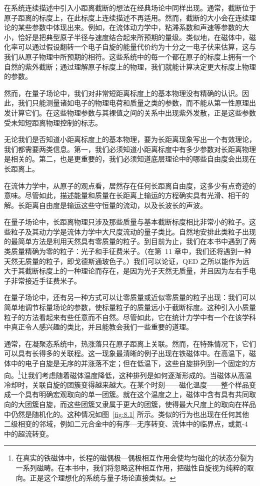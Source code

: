 在系统连续描述中引入小距离截断的想法在经典场论中同样出现。通常，截断位于原子距离的标度上，在此标度上连续描述不再适用。然而，截断的大小会在连续理论的某些参数中体现出来。例如，在流体动力学中，粘滞系数和声速等参数的大小，恰好是把典型原子半径与速度结合起来所预期的量级。类似地，在磁体中，磁化率可以通过假设翻转一个电子自旋的能量代价约为十分之一电子伏来估算，这与我们从原子物理中所预期的相符。这些系统中的每一个都在原子的标度上拥有一个自然的紫外截断；通过理解原子标度上的物理，我们就能计算决定更大标度上物理的参数。

然而，在量子场论中，我们对非常短距离标度上的基本物理没有精确的认识。因此，我们只能测量诸如电子的物理电荷和质量之类的参数，而不能从第一性原理出发计算它们。在这些物理参数与其裸值之间的关系中出现紫外发散，正是这些参数受未知短距离物理控制的标志。

无论我们是否知道小距离标度上的基本物理，要为长距离现象写出一个有效理论，我们都需要两类信息。第一，我们必须知道小距离标度中有多少参数对长距离物理是相关的。第二，也是更重要的，我们必须知道底层理论中的哪些自由度会出现在长距离上。

在流体力学中，从原子的观点看，居然存在任何长距离自由度，这多少有点奇迹的意味。尽管如此，描述能量和质量在长距离上输运的方程确实具有光滑、相干的解。长距离自由度是输运这些守恒量的流动，以及长波长的声波。

在量子场论中，长距离物理只涉及那些质量与基本截断标度相比非常小的粒子。这些粒子及其动力学是流体力学中大尺度流动的量子类比。自然地安排此类粒子出现的最简单方法是利用天然具有零质量的粒子。到目前为止，我们在本书中遇到了两类质量精确为零的粒子：光子和手征费米子。（在第~11 章中，我们还将遇到一种天然无质量的粒子，即戈德斯通玻色子。）我们可以论证，QED 之所以能作为远大于其截断标度上的一种理论而存在，是因为光子天然无质量，并且因为左右手电子非常接近手征费米子。

在量子场论中，还有另一种方式可以让零质量或近似零质量的粒子出现：我们可以简单地调节标量场论的参数，使标量粒子的质量远小于截断标度。这种引入小质量粒子的方法看起来有些任意而不自然。尽管如此，它在统计力学中有一个在该学科中真正令人感兴趣的类比，并且能教会我们一些重要的道理。

通常，在凝聚态系统中，热涨落只在原子距离上关联。然而，在特殊情况下，它们可以具有长得多的关联程。这一现象最清晰的例子出现在铁磁体中。在高温下，磁体中的电子自旋是无序的并涨落不定；但在低温下，这些自旋排列到一个固定的方向。\footnote{在真实的铁磁体中，长程的磁偶极—偶极相互作用会使均匀磁化的状态分裂为一系列磁畴。在本书中，我们将忽略这种相互作用，把磁性自旋视为纯粹的取向。正是这个理想化的系统与量子场论直接类似。}让我们考虑随着磁体温度降低，这种排列是如何逐渐形成的。当磁体从高温冷却时，关联自旋的团簇变得越来越大。在某个时刻——磁化温度——整个样品变成一个具有明确宏观取向的单一团簇。就在这个温度之上，磁体中含有具有共同取向的大团簇自旋，而这些团簇又隶属于更大的团簇，使得最大尺度上的取向在样品中仍然是随机化的。这种情况如图~\ref{fig:8.1} 所示。类似的行为也出现在任何其他二级相变的邻域，例如二元合金中的有序—无序转变、流体中的临界点，或氦-4 中的超流转变。

